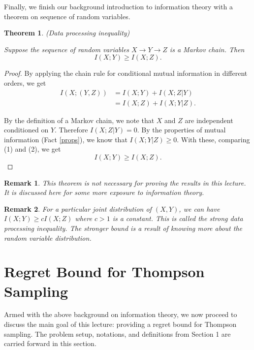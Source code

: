 \documentclass[11pt]{article}
\newtheorem{theorem}{Theorem}[section]
\newtheorem{remark}{Remark}[theorem]
\begin{document}
Finally, we finish our background introduction to information theory with a theorem on sequence of random variables.
\begin{theorem}
(Data processing inequality)

Suppose the sequence of random variables $X \rightarrow Y \rightarrow Z$ is a Markov chain. Then 
\begin{equation*}
    I(X;Y) \ge I(X;Z).
\end{equation*}
\end{theorem}
\begin{proof}
By applying the chain rule for conditional mutual information in different orders, we get
\begin{align}
    I(X;(Y,Z)) & = I(X;Y) + I(X;Z|Y) \\
    & = I(X;Z) + I(X;Y|Z).
\end{align}

By the definition of a Markov chain, we note that $X$ and $Z$ are independent conditioned on $Y$. Therefore $I(X;Z|Y) = 0$. By the properties of mutual information (Fact \ref{props}), we know that $I(X;Y|Z) \ge 0$. With these, comparing (1) and (2), we get
\begin{equation*}
    I(X;Y) \ge I(X;Z).
\end{equation*}
\end{proof}

\begin{remark}
This theorem is not necessary for proving the results in this lecture. It is discussed here for some more exposure to information theory.
\end{remark}

\begin{remark}
For a particular joint distribution of $(X, Y)$, we can have $I(X;Y) \ge cI(X;Z)$ where $c > 1$ is a constant. This is called the strong data processing inequality. The stronger bound is a result of knowing more about the random variable distribution.
\end{remark}

\section{Regret Bound for Thompson Sampling}
Armed with the above background on information theory, we now proceed to discuss the main goal of this lecture: providing a regret bound for Thompson sampling. The problem setup, notations, and definitions from Section 1 are carried forward in this section.
\end{document}
